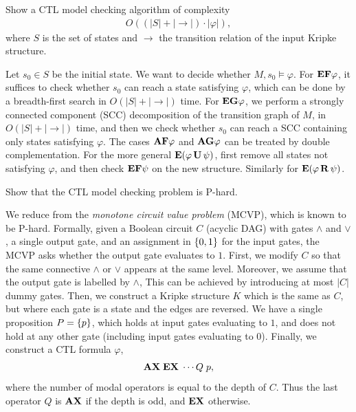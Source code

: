 \begin{exercise}
	Show a CTL model checking algorithm of complexity
	\begin{align*}
		O((|S| + |\to|) \cdot |\varphi|),
	\end{align*}
	where $S$ is the set of states and $\to$ the transition relation of the input Kripke structure.
\end{exercise}
%
\begin{solution}
	Let $s_0 \in S$ be the initial state.
	We want to decide whether $M, s_0 \models \varphi$.
	For $\mathbf{EF} \varphi$, it suffices to check whether $s_0$ can reach a state satisfying $\varphi$,
	which can be done by a breadth-first search in $O(|S| + |\to|)$ time.
	For $\mathbf{EG} \varphi$, we perform a strongly connected component (SCC) decomposition
	of the transition graph of $M$,	in $O(|S| + |\to|)$ time,
	and then we check whether $s_0$ can reach a SCC containing only states satisfying $\varphi$.
	The cases $\mathbf{AF} \varphi$ and $\mathbf{AG} \varphi$ can be treated by double complementation.
	For the more general $\mathbf E(\varphi \,\mathbf U\, \psi)$,
	first remove all states not satisfying $\varphi$,
	and then check $\mathbf{EF} \psi$ on the new structure.
	Similarly for $\mathbf E(\varphi \,\mathbf R\, \psi)$.
\end{solution}

\begin{exercise}
	Show that the CTL model checking problem is P-hard.
\end{exercise}
%
\begin{solution}
	We reduce from the \emph{monotone circuit value problem} (MCVP), which is known to be P-hard.
	Formally, given a Boolean circuit $C$ (acyclic DAG) with gates $\land$ and $\lor$, a single output gate,
	and an assignment in $\left\{0, 1\right\}$ for the input gates,
	the MCVP asks whether the output gate evaluates to $1$.
	First, we modify $C$ so that the same connective $\land$ or $\lor$ appears at the same level.
	Moreover, we assume that the output gate is labelled by $\land$,
	This can be achieved by introducing at most $|C|$ dummy gates.
	Then, we construct a Kripke structure $K$ which is the same as $C$,
	but where each gate is a state and the edges are reversed.
	We have a single proposition $P = \left\{p\right\}$,
	which holds at input gates evaluating to $1$,
	and does not hold at any other gate (including input gates evaluating to $0$).
	Finally, we construct a CTL formula $\varphi$,
	\begin{align*}
		\mathbf{AX}\; \mathbf{EX}\; \cdots Q\; p,
	\end{align*}
	where the number of modal operators is equal to the depth of $C$.
	Thus the last operator $Q$ is $\mathbf{AX}$ if the depth is odd, and $\mathbf{EX}$ otherwise.
\end{solution}




